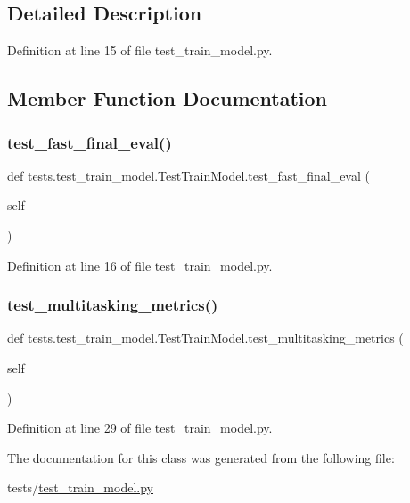 \subsection{Detailed Description}


Definition at line 15 of file test\+\_\+train\+\_\+model.\+py.



\subsection{Member Function Documentation}
\mbox{\label{classtests_1_1test__train__model_1_1TestTrainModel_affbd00e2cf6b61eae40b5f6e4c1cd8a9}} 
\subsubsection{\texorpdfstring{test\+\_\+fast\+\_\+final\+\_\+eval()}{test\_fast\_final\_eval()}}
{\footnotesize\ttfamily def tests.\+test\+\_\+train\+\_\+model.\+Test\+Train\+Model.\+test\+\_\+fast\+\_\+final\+\_\+eval (\begin{DoxyParamCaption}\item[{}]{self }\end{DoxyParamCaption})}



Definition at line 16 of file test\+\_\+train\+\_\+model.\+py.

\mbox{\label{classtests_1_1test__train__model_1_1TestTrainModel_a099516526ea34f8ad88bf921e94c01b9}} 
\subsubsection{\texorpdfstring{test\+\_\+multitasking\+\_\+metrics()}{test\_multitasking\_metrics()}}
{\footnotesize\ttfamily def tests.\+test\+\_\+train\+\_\+model.\+Test\+Train\+Model.\+test\+\_\+multitasking\+\_\+metrics (\begin{DoxyParamCaption}\item[{}]{self }\end{DoxyParamCaption})}



Definition at line 29 of file test\+\_\+train\+\_\+model.\+py.



The documentation for this class was generated from the following file\+:\begin{DoxyCompactItemize}
\item 
tests/\hyperlink{test__train__model_8py}{test\+\_\+train\+\_\+model.\+py}\end{DoxyCompactItemize}
